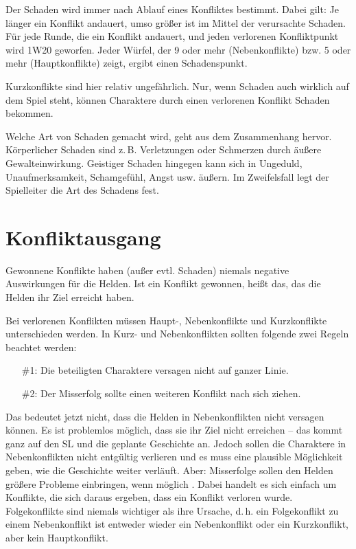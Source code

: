 Der Schaden wird immer nach Ablauf eines Konfliktes bestimmt. Dabei gilt: Je länger ein Konflikt andauert, umso größer ist im Mittel der verursachte Schaden. Für jede Runde, die ein Konflikt andauert, und jeden verlorenen Konfliktpunkt wird 1W20 geworfen. Jeder Würfel, der 9 oder mehr (Nebenkonflikte) bzw. 5 oder mehr (Hauptkonflikte) zeigt, ergibt einen Schadenspunkt.

Kurzkonflikte sind hier relativ ungefährlich. Nur, wenn Schaden auch wirklich auf dem Spiel steht, können Charaktere durch einen verlorenen Konflikt Schaden bekommen. 

Welche Art von Schaden gemacht wird, geht aus dem Zusammenhang hervor. Körperlicher Schaden sind z.\,B. Verletzungen oder Schmerzen durch äußere Gewalteinwirkung. Geistiger Schaden hingegen kann sich in Ungeduld, Unaufmerksamkeit, Schamgefühl, Angst usw. äußern. Im Zweifelsfall legt der Spielleiter die Art des Schadens fest.

\section{Konfliktausgang}
Gewonnene Konflikte haben (außer evtl. Schaden) niemals negative Auswirkungen für die Helden. Ist ein Konflikt gewonnen, heißt das, das die Helden ihr Ziel erreicht haben.

Bei verlorenen Konflikten müssen Haupt-, Nebenkonflikte und Kurzkonflikte unterschieden werden. In Kurz- und Nebenkonflikten sollten folgende zwei Regeln beachtet werden:
\begin{enumerate}
\item[\#1:] Die beteiligten Charaktere versagen nicht auf ganzer Linie.
\item[\#2:] Der Misserfolg sollte einen weiteren Konflikt nach sich ziehen.
\end{enumerate}
Das bedeutet jetzt nicht, dass die Helden in Nebenkonflikten nicht versagen können. Es ist problemlos möglich, dass sie ihr Ziel nicht erreichen -- das kommt ganz auf den SL und die geplante Geschichte an. Jedoch sollen die Charaktere in Nebenkonflikten nicht entgültig verlieren und es muss eine plausible Möglichkeit geben, wie die Geschichte weiter verläuft. Aber: Misserfolge sollen den Helden größere Probleme einbringen, wenn möglich . Dabei handelt es sich einfach um Konflikte, die sich daraus ergeben, dass ein Konflikt verloren wurde. Folgekonflikte sind niemals wichtiger als ihre Ursache, d.\,h. ein Folgekonflikt zu einem Nebenkonflikt ist entweder wieder ein Nebenkonflikt oder ein Kurzkonflikt, aber kein Hauptkonflikt.

